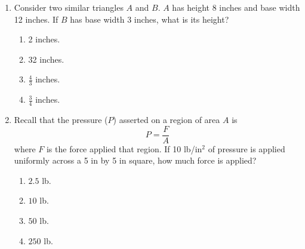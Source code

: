 \documentclass{article}
\begin{document}
\begin{enumerate}
  \item Consider two similar triangles $A$ and $B$.  $A$ has height 8 inches and base width 12 inches.  If $B$ has base width 3 inches, what is its height?
  \begin{enumerate}
    \item 2 inches. %
    \item 32 inches.
    \item $\frac{4}{3}$ inches.
    \item $\frac{3}{4}$ inches.

  \end{enumerate}
  


\item Recall that the pressure ($P$) asserted on a region of area $A$ is $$P=\frac{F}{A}$$ where $F$ is the force applied that region.  If 10 lb/in$^2$ of pressure is applied uniformly across a 5 in by 5 in square, how much force is applied?
  \begin{enumerate}
    \item $2.5$ lb.
    \item $10$ lb.
    \item $50$ lb.      
    \item $250$ lb. %
 
  \end{enumerate}
  
  
    
\end{enumerate}
\end{document}
